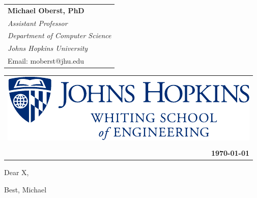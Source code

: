 \documentclass[11pt]{article}
\begin{document}
\begin{tabular}[t]{@{} l @{}}
  \bfseries 
  Michael Oberst, PhD \\
  \itshape%
  Assistant Professor\\
  \itshape%
  Department of Computer Science \\
  \itshape%
  Johns Hopkins University \\
  Email: moberst@jhu.edu \\
\end{tabular}
\hfill
\begin{tabular}[t]{@{} r @{}}
  \includegraphics[height=3\normalbaselineskip,valign=t,halign=r]{whiting.logo.horizontal.blue-crop.pdf} \\
  \\
  \textbf{\today} 
\end{tabular}%

Dear X,

\lipsum[1-4]

Best,
Michael
\end{document}
